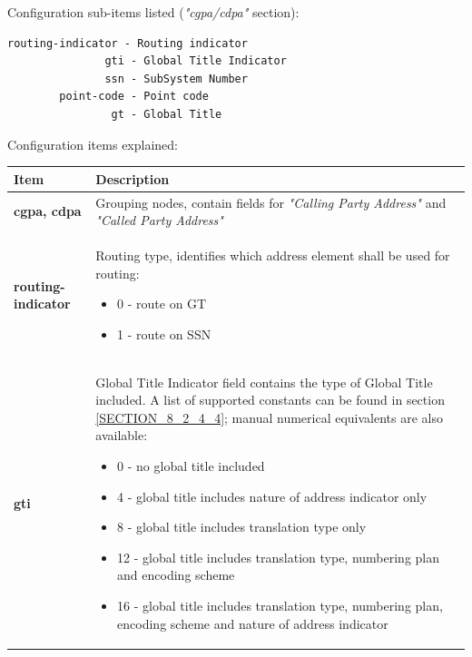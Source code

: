 \documentclass[a4paper,latin]{paper}
\begin{document}
\noindent{}Configuration sub-items listed (\textit{"cgpa/cdpa"} section):
\begin{lstlisting}[style=BashInputStyle, belowskip=\baselineskip]
 routing-indicator - Routing indicator
               gti - Global Title Indicator
               ssn - SubSystem Number
        point-code - Point code
                gt - Global Title
\end{lstlisting}
\noindent{}Configuration items explained:\\
\begin{tabularx}{\textwidth}{ | l | X |}
	\hline
	Item	 				& Description \\
	\hline
	\textbf{cgpa, cdpa}			& Grouping nodes, contain fields for \textit{"Calling Party Address"} and \textit{"Called Party Address"} \\ 
	\textbf{routing-indicator}		& Routing type, identifies which address element shall be used for routing: 
						  \begin{itemize} 
							\setlength{\itemsep}{0pt}
							\setlength{\parskip}{0pt}
							\setlength{\parsep}{0pt} 
							\item 0 - route on GT
							\item  1 - route on SSN
						  \end{itemize} \\
	\textbf{gti}				& Global Title Indicator field contains the type of Global Title included. A list of supported constants can be found in 
						  section \ref{SECTION_8_2_4_4}; manual numerical equivalents are also available:
						  \begin{itemize}
							\setlength{\itemsep}{0pt}
							\setlength{\parskip}{0pt}
							\setlength{\parsep}{0pt} 
							\item 0 - no global title included
							\item 4 - global title includes nature of address indicator only
							\item 8 - global title includes translation type only
							\item 12 - global title includes translation type, numbering plan and encoding scheme
							\item 16 - global title includes translation type, numbering plan, encoding scheme and nature of address indicator
						  \end{itemize} \\
	\hline
\end{tabularx}
\clearpage
\end{document}
